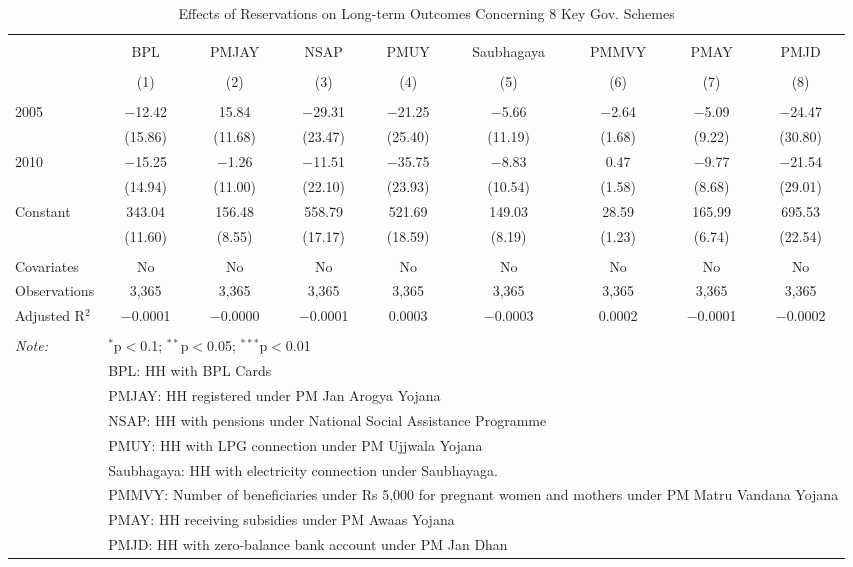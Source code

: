 
\begin{table}[!htbp] \centering 
  \caption{Effects of Reservations on Long-term Outcomes Concerning 8 Key Gov. Schemes} 
  \label{raj_shrug_children_05_10} 
\scriptsize 
\begin{tabular}{@{\extracolsep{1pt}}lcccccccc} 
\\[-1.8ex]\hline 
\hline \\[-1.8ex] 
 & BPL & PMJAY & NSAP & PMUY & Saubhagaya & PMMVY & PMAY & PMJD \\ 
\\[-1.8ex] & (1) & (2) & (3) & (4) & (5) & (6) & (7) & (8)\\ 
\hline \\[-1.8ex] 
 2005 & $-$12.42 & 15.84 & $-$29.31 & $-$21.25 & $-$5.66 & $-$2.64 & $-$5.09 & $-$24.47 \\ 
  & (15.86) & (11.68) & (23.47) & (25.40) & (11.19) & (1.68) & (9.22) & (30.80) \\ 
  2010 & $-$15.25 & $-$1.26 & $-$11.51 & $-$35.75 & $-$8.83 & 0.47 & $-$9.77 & $-$21.54 \\ 
  & (14.94) & (11.00) & (22.10) & (23.93) & (10.54) & (1.58) & (8.68) & (29.01) \\ 
  Constant & 343.04 & 156.48 & 558.79 & 521.69 & 149.03 & 28.59 & 165.99 & 695.53 \\ 
  & (11.60) & (8.55) & (17.17) & (18.59) & (8.19) & (1.23) & (6.74) & (22.54) \\ 
 \hline \\[-1.8ex] 
Covariates & No & No & No & No & No & No & No & No \\ 
Observations & 3,365 & 3,365 & 3,365 & 3,365 & 3,365 & 3,365 & 3,365 & 3,365 \\ 
Adjusted R$^{2}$ & $-$0.0001 & $-$0.0000 & $-$0.0001 & 0.0003 & $-$0.0003 & 0.0002 & $-$0.0001 & $-$0.0002 \\ 
\hline 
\hline \\[-1.8ex] 
\textit{Note:}  & \multicolumn{8}{l}{$^{*}$p$<$0.1; $^{**}$p$<$0.05; $^{***}$p$<$0.01} \\ 
 & \multicolumn{8}{l}{BPL: HH with BPL Cards} \\ 
 & \multicolumn{8}{l}{PMJAY: HH registered under PM Jan Arogya Yojana} \\ 
 & \multicolumn{8}{l}{NSAP: HH with pensions under National Social Assistance Programme} \\ 
 & \multicolumn{8}{l}{PMUY: HH with LPG connection under PM Ujjwala Yojana} \\ 
 & \multicolumn{8}{l}{Saubhagaya: HH with electricity connection under Saubhayaga.} \\ 
 & \multicolumn{8}{l}{PMMVY: Number of beneficiaries under Rs 5,000 for pregnant women and mothers under PM Matru Vandana Yojana} \\ 
 & \multicolumn{8}{l}{PMAY: HH receiving subsidies under PM Awaas Yojana} \\ 
 & \multicolumn{8}{l}{PMJD: HH with zero-balance bank account under PM Jan Dhan} \\ 
\end{tabular} 
\end{table} 
